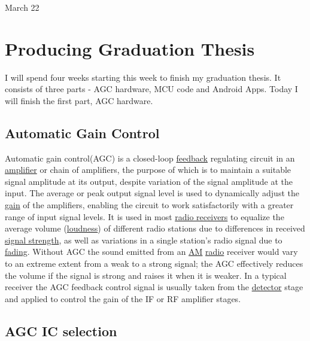 \univlogo

{\Huge March 22}\vspace{5mm}

\section*{Producing Graduation Thesis}

I will spend four weeks starting this week to finish my graduation thesis. It consists of three parts - AGC hardware, MCU code and Android Apps. Today I will finish the first part, AGC hardware.

\subsection*{Automatic Gain Control}

Automatic gain control(AGC) is a closed-loop \href{https://en.wikipedia.org/wiki/Feedback}{feedback} regulating circuit in an \href{https://en.wikipedia.org/wiki/Amplifier}{amplifier} or chain of amplifiers, the purpose of which is to maintain a suitable signal amplitude at its output, despite variation of the signal amplitude at the input. The average or peak output signal level is used to dynamically adjust the \href{https://en.wikipedia.org/wiki/Gain_(electronics)}{gain} of the amplifiers, enabling the circuit to work satisfactorily with a greater range of input signal levels. It is used in most \href{https://en.wikipedia.org/wiki/Radio_receiver}{radio receivers} to equalize the average volume (\href{https://en.wikipedia.org/wiki/Loudness}{loudness}) of different radio stations due to differences in received \href{https://en.wikipedia.org/wiki/Signal_strength}{signal strength}, as well as variations in a single station's radio signal due to \href{https://en.wikipedia.org/wiki/Fading}{fading}. Without AGC the sound emitted from an \href{https://en.wikipedia.org/wiki/Amplitude_modulation}{AM} \href{https://en.wikipedia.org/wiki/Radio}{radio} receiver would vary to an extreme extent from a weak to a strong signal; the AGC effectively reduces the volume if the signal is strong and raises it when it is weaker. In a typical receiver the AGC feedback control signal is usually taken from the \href{https://en.wikipedia.org/wiki/Detector_(radio)}{detector} stage and applied to control the gain of the IF or RF amplifier stages.


\subsection*{AGC IC selection}

